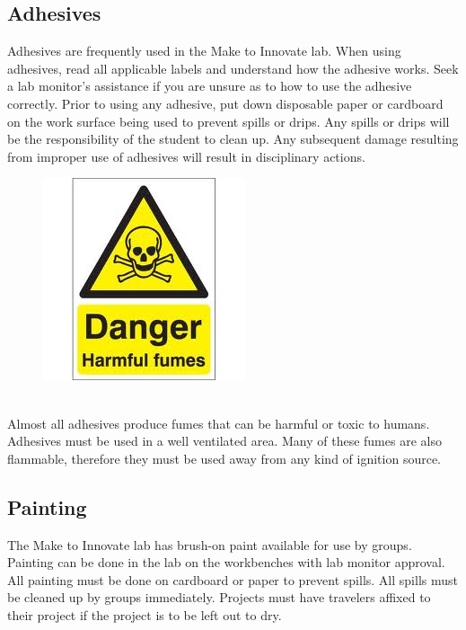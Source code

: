 \subsection{Adhesives}
Adhesives are frequently used in the Make to Innovate lab. When using adhesives, read all applicable labels and understand how the adhesive works. Seek a lab monitor's assistance if you are unsure as to how to use the adhesive correctly. Prior to using any adhesive, put down disposable paper or cardboard on the work surface being used to prevent spills or drips. Any spills or drips will be the responsibility of the student to clean up. Any subsequent damage resulting from improper use of adhesives will result in disciplinary actions.
\begin{framed}
\begin{figure}
\includegraphics[width=\linewidth]{images/fumes_hazard.jpg}
\end{figure}
\ \\
Almost all adhesives produce fumes that can be harmful or toxic to humans.  Adhesives must be used in a well ventilated area.  Many of these fumes are also flammable, therefore they must be used away from any kind of ignition source.
\end{framed}
\subsection{Painting}
The Make to Innovate lab has brush-on paint available for use by groups. Painting can be done in the lab on the workbenches with lab monitor approval. All painting must be done on cardboard or paper to prevent spills. All spills must be cleaned up by groups immediately. Projects must have travelers affixed to their project if the project is to be left out to dry. 

